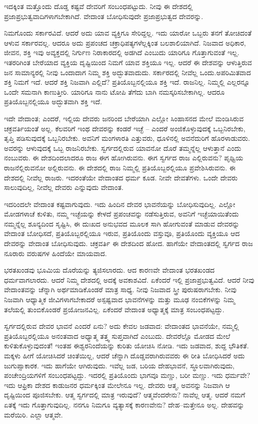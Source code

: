 ಇದಕ್ಕಿಂತ ಮತ್ತೊಂದು ದೊಡ್ಡ ಕಷ್ಟವೆ ದೇವರಿಗೆ ಸಂಬಂಧಪಟ್ಟುದು. ನೀವು ಈ ದೇಶದಲ್ಲಿ ಪ್ರಜಾಪ್ರಭುತ್ವವಾದಿಗಳಾಗಬೇಕಾಗಿದೆ. ವೇದಾಂತ ಬೋಧಿಸುವುದೇ ಪ್ರಜಾಪ್ರಭುತ್ವದ ದೇವರನ್ನು.

ನಿಮಗೊಂದು ಸರ್ಕಾರವಿದೆ. ಆದರೆ ಅದು ಯಾವ ವ್ಯಕ್ತಿಗೂ ಸೇರಿದ್ದಲ್ಲ. ಇದು ಯಾರೋ ಒಬ್ಬರು ತನಗೆ ತೋಚಿದಂತೆ ಆಳುವ ಸರ್ಕಾರವಲ್ಲ. ಆದರೂ ಅದು ಪ್ರಪಂಚದ ಚಕ್ರಾಧಿಪತ್ಯಗಳೆಲ್ಲಕ್ಕಿಂತ ಬಲಶಾಲಿಯಾಗಿದೆ. ನಿಜವಾದ ಅಧಿಕಾರ, ಜೀವನ, ಶಕ್ತಿ ಇವು ಅವ್ಯಕ್ತದಲ್ಲಿ ನಿರ್ಗುಣ ನಿರಾಕಾರದಲ್ಲಿ ಅಡಗಿದೆ ಎಂಬುದು ಯಾರಿಗೂ ಗೊತ್ತಾಗುವಂತೆ ಇಲ್ಲ. ಇತರರಿಗಿಂತ ಬೇರೆಯಾದ ವ್ಯಕ್ತಿಯ ದೃಷ್ಟಿಯಿಂದ ನಿಮಗೆ ಯಾವ ಶಕ್ತಿಯೂ ಇಲ್ಲ. ಆದರೆ ಈ ದೇಶವನ್ನು ಆಳುತ್ತಿರುವ ಜನ ಸಾಮಾನ್ಯರಲ್ಲಿ ನೀವು ಒಂದಾದಾಗ ನಿಮ್ಮ ಶಕ್ತಿ ಅದ್ಭುತವಾದುದು. ಸರ್ಕಾರದಲ್ಲಿ ನೀವೆಲ್ಲ ಒಂದು.\break ಅಪರಿಮಿತವಾದ ಶಕ್ತಿ ನಿಮಗೆ ಇದೆ. ಆದರೆ ಶಕ್ತಿ ನಿಜವಾಗಿ ಎಲ್ಲಿದೆ? ಪ್ರತಿಯೊಬ್ಬನಲ್ಲಿಯೂ ಶಕ್ತಿ ಇದೆ. ರಾಜನಿಲ್ಲ. ನಿಮ್ಮಲ್ಲಿ ಎಲ್ಲರನ್ನೂ ಒಂದೇ ಸಮನಾಗಿ ಕಾಣುತ್ತೀರಿ. ಯಾರಿಗೂ ನಾನು ಟೋಪಿ ತೆಗೆದು ಬಾಗಿ ನಮಸ್ಕರಿಸಬೇಕಾಗಿಲ್ಲ. ಆದರೂ ಪ್ರತಿಯೊಬ್ಬನಲ್ಲಿಯೂ ಅದ್ಭುತವಾಗಿ ಶಕ್ತಿ ಇದೆ.

ಇದೇ ವೇದಾಂತ; ಎಂದರೆ, ಇಲ್ಲಿಯ ದೇವರು ಜನರಿಂದ ಬೇರೆಯಾಗಿ ಎಲ್ಲೋ ಸಿಂಹಾಸನದ ಮೇಲೆ ಮಂಡಿಸಿರುವ ಚಕ್ರವರ್ತಿಯಂತೆ ಅಲ್ಲ. ಕೆಲವರಿಗೆ ಇಂಥ ದೇವರನ್ನು ಕಂಡರೆ ಇಚ್ಛೆ – ಎಂದರೆ ಅಂಜಿಕೊಳ್ಳುವುದಕ್ಕೆ ಒಬ್ಬನಿರಬೇಕು, ತೃಪ್ತಿ ಪಡಿಸುವುದಕ್ಕೆ ಒಬ್ಬನಿರಬೇಕು. ಅವನಿಗೆ ಮಂಗಳಾರತಿ ಎತ್ತುವರು, ಧೂಳಿನಲ್ಲಿ ಅವನೆದುರಿಗೆ ಹೊರಳಾಡುವರು. ಅವರನ್ನು ಆಳುವುದಕ್ಕೆ ಒಬ್ಬ ರಾಜನಿರಬೇಕು. ಸ್ವರ್ಗದಲ್ಲಿರುವ ಯಾವನೋ ದೊರೆ ತಮ್ಮನ್ನೆಲ್ಲ ಆಳುತ್ತಾನೆ ಎಂದು ನಂಬುವರು. ಈ ದೇಶದಿಂದಲಾದರೂ ರಾಜ ಈಗ ಹೋಗಿರುವನು. ಈಗ ಸ್ವರ್ಗದ ರಾಜ ಎಲ್ಲಿರುವನು? ಪೃಥ್ವಿಯ ರಾಜನೆಲ್ಲಿರುವನೋ ಅಲ್ಲಿರುವನು. ಈ ದೇಶದಲ್ಲಿ ರಾಜ ನಿಮ್ಮಲ್ಲಿ ಪ್ರತಿಯೊಬ್ಬರಲ್ಲಿಯೂ ಪ್ರವೇಶಿಸಿರುವನು. ಈ ದೇಶದಲ್ಲಿ ನೀವೆಲ್ಲ ರಾಜರು. ಇದರಂತೆಯೇ ವೇದಾಂತದ ಧರ್ಮ ಕೂಡ. ನೀವೇ ದೇವತೆಗಳು. ಒಂದೇ ದೇವರು ಸಾಲುವುದಿಲ್ಲ, ನೀವೆಲ್ಲ ದೇವರು ಎನ್ನುವುದು ವೇದಾಂತ.

ಇದರಿಂದಲೇ ವೇದಾಂತ ಕಷ್ಟವಾಗುವುದು. ಇದು ಹಿಂದಿನ ದೇವರ ಭಾವನೆಯನ್ನು ಬೋಧಿಸುವುದಿಲ್ಲ. ಎಲ್ಲೋ ಮೋಡಗಳಾಚೆ ಕುಳಿತು, ನಮ್ಮ ಇಚ್ಛೆಯನ್ನು ಕೇಳದೆ ಪ್ರಪಂಚವನ್ನು ನಡೆಸುತ್ತಿರುವ, ಅವನಿಗೆ ಇಚ್ಛೆಯಾಯಿತೆಂದು ನಮ್ಮನ್ನೆಲ್ಲ ಶೂನ್ಯದಿಂದ ಸೃಷ್ಟಿಸಿ, ಈ ದುಃಖದ ಅನುಭವದ ಮೂಲಕ ಸಾಗಿ ಹೋಗುವಂತೆ ಮಾಡುವ ದೇವರನ್ನು ವೇದಾಂತ ಬೋಧಿಸದೆ, ಪ್ರತಿಯೊಬ್ಬರಲ್ಲಿಯೂ ಇರುವ, ಪ್ರತಿಯೊಂದು ವಸ್ತುವೂ, ಪ್ರತಿಯೊಂದು ವ್ಯಕ್ತಿಯೂ ಆದ ದೇವರನ್ನು ವೇದಾಂತ ಬೋಧಿಸುವುದು. ಚಕ್ರವರ್ತಿ ಈ ದೇಶದಿಂದ ಹೋದ. ಹಾಗೆಯೇ ವೇದಾಂತದಲ್ಲಿ ಸ್ವರ್ಗದ ರಾಜ ನೂರಾರು ವರುಷಗಳ ಹಿಂದೆಯೇ ಮಾಯವಾದ.

ಭರತಖಂಡವು ಭೂಮಿಯ ದೊರೆಯನ್ನು ತ್ಯಜಿಸಲಾರದು. ಆದ ಕಾರಣವೇ ವೇದಾಂತ ಭರತಖಂಡದ ಧರ್ಮವಾಗಲಾರದು. ಆದರೆ ನಿಮ್ಮ ದೇಶದಲ್ಲಿ ಅದಕ್ಕೆ ಅವಕಾಶವಿದೆ. ಏಕೆಂದರೆ ಇಲ್ಲಿ ಪ್ರಜಾಪ್ರಭುತ್ವವಿದೆ. ಆದರೆ ನೀವು ವೇದಾಂತವನ್ನು ಚೆನ್ನಾಗಿ ಅರ್ಥಮಾಡಿಕೊಂಡರೆ ಮಾತ್ರ ಸಾಧ್ಯ. ನೀವು ನಿಜವಾದ ಸ್ತ್ರೀ ಪುರುಷರಾಗಬೇಕು. ನೀವು ನಿಜವಾಗಿ ಆಧ್ಯಾತ್ಮಿಕ ಜೀವಿಗಳಾಗಬೇಕಾದರೆ ಅಸ್ಪಷ್ಟವಾದ ಭಾವನೆಗಳನ್ನು ಮತ್ತು ಮೂಢ ನಂಬಿಕೆಗಳನ್ನು ನಿಮ್ಮ ತಲೆಯಲ್ಲಿ ತುಂಬಿಕೊಂಡರೆ ಪ್ರಯೋಜನವಿಲ್ಲ. ಏಕೆಂದರೆ ವೇದಾಂತ ಅಧ್ಯಾತ್ಮಕ್ಕೆ ಮಾತ್ರ ಸಂಬಂಧಪಟ್ಟದ್ದು.

ಸ್ವರ್ಗದಲ್ಲಿರುವ ದೇವರ ಭಾವನೆ ಎಂದರೆ ಏನು? ಅದು ಕೇವಲ ಜಡವಾದ: ವೇದಾಂತದ ಭಾವನೆಯೇ, ನಮ್ಮಲ್ಲಿ ಪ್ರತಿಯೊಬ್ಬರಲ್ಲಿಯೂ ಅನಂತವಾದ ಅಧ್ಯಾತ್ಮ ತತ್ತ್ವ ಸುಪ್ತವಾಗಿದೆ ಎಂಬುದು. ದೇವರೆಲ್ಲೊ ಮೋಡದ ಮೇಲೆ ಕುಳಿತುಕೊಳ್ಳುವುದಂತೆ! ಇಂತಹ ಈಶ್ವರನಿಂದೆಯನ್ನು ಕುರಿತು ಯೋಚಿಸಿ ನೋಡಿ. ಇದು ಜಡವಾದ, ಶುದ್ದ ಭೌತಿಕತೆ. ಮಕ್ಕಳು ಹೀಗೆ ಯೋಚಿಸಿದರೆ ಚಿಂತೆಯಿಲ್ಲ, ಆದರೆ ಚೆನ್ನಾಗಿ ದೊಡ್ಡವರಾಗಿರುವವರು ಈ ರೀತಿ ಬೋಧಿಸಿದರೆ ಅದು ಜುಗುಪ್ಸಾಕಾರಕ. ಇದು ಹಾಗೆಯೇ ಆಗಿರುವುದು. ಇವೆಲ್ಲ ಜಡ, ಬರಿಯ ದೇಹಭಾವನೆ, ಸ್ಥೂಲವಾಗಿರುವುದು, ಪಂಚೇಂದ್ರಿಯಗಳಿಗೆ ಸಂಬಂಧಪಟ್ಟದ್ದು. ಇದರಲ್ಲಿ ಪ್ರತಿಯೊಂದು ಭಾಗವೂ ಮಣ್ಣು, ಬರೀ ಮಣ್ಣು. ಇದು ಧರ್ಮವೇ? ಇದು ಆಫ್ರಿಕಾ ದೇಶದ ಕಾಡುಜನರ ಧರ್ಮಕ್ಕಿಂತ ಮೇಲೇನೂ ಇಲ್ಲ. ದೇವರು ಆತ್ಮ, ಅವನನ್ನು ನಿಜವಾಗಿ ಆ ದೃಷ್ಟಿಯಿಂದ ಪೂಜಿಸಬೇಕು. ಆತ್ಮ ಸ್ವರ್ಗದಲ್ಲಿ ಮಾತ್ರ ಇರುವುದೆ? ಆತ್ಮವೆಂದರೇನು? ನಾವೆಲ್ಲ ಆತ್ಮ. ಆದರೆ ನಮಗೆ ಏತಕ್ಕೆ ಇದು ಗೊತ್ತಾಗುವುದಿಲ್ಲ. ನನಗೂ ನಿಮಗೂ ವ್ಯತ್ಯಾಸಕ್ಕೆ ಕಾರಣವೇನು? ದೇಹ–ಮತ್ತೇನೂ ಅಲ್ಲ. ದೇಹವನ್ನು ಮರೆಯಿರಿ. ಎಲ್ಲಾ ಆತ್ಮವೇ.

